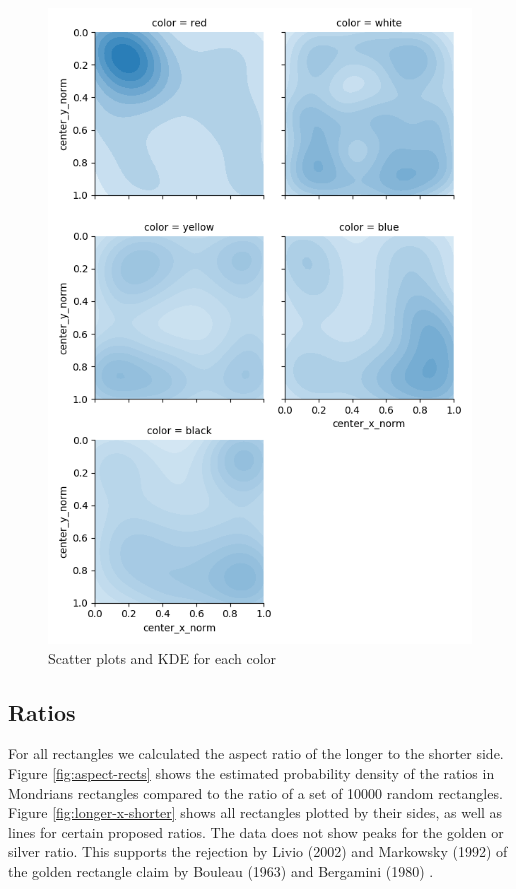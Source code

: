 \documentclass[serif,article,noparskip]{agse-thesis}
\begin{document}
\begin{figure}
\includegraphics[width=\linewidth]{images/kernel-densities.png}
\caption{Scatter plots and KDE for each color}
\label{fig:kde}
\end{figure}

\subsection{Ratios} \label{ratios}

For all rectangles we calculated the aspect ratio of the longer to the shorter
side. Figure \ref{fig:aspect-rects} shows the estimated probability density of
the ratios in Mondrians rectangles compared to the ratio of a set of 10000
random rectangles. Figure \ref{fig:longer-x-shorter} shows all rectangles
plotted by their sides, as well as lines for certain proposed ratios. The data
does not show peaks for the golden or silver ratio. This supports the rejection
by Livio (2002) \cite{Livio2002} and Markowsky (1992) \cite{Markowsky1992} of
the golden rectangle claim by Bouleau (1963) \cite{bouleau1963} and Bergamini
(1980) \cite{bergamini1980}.
\end{document}
